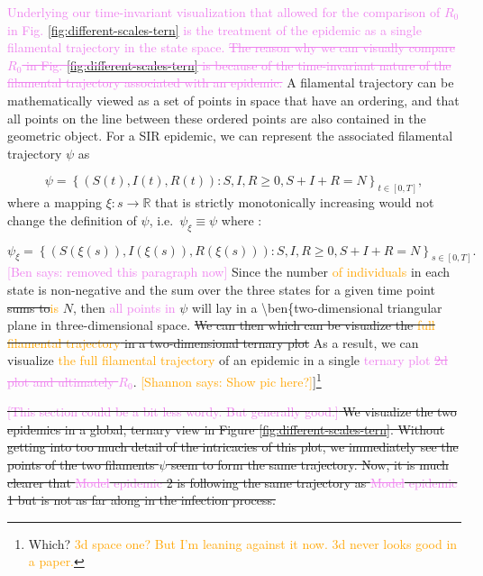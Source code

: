 \documentclass[
  shortnames]{jss}
\begin{document}
\textcolor{violet}{Underlying our time-invariant visualization that allowed for the comparison of $R_0$ in Fig. \ref{fig:different-scales-tern} is the treatment of the epidemic as a single filamental trajectory in the state space. \sout{The reason why we can visually compare $R_0$ in Fig. \ref{fig:different-scales-tern} is because of the time-invariant nature of the filamental trajectory associated with an epidemic.}}
A filamental trajectory can be mathematically viewed as a set of points
in space that have an ordering, and that all points on the line between
these ordered points are also contained in the geometric object. For a
SIR epidemic, we can represent the associated filamental trajectory
\(\psi\) as

\[
\psi = \left \{(S(t), I(t), R(t)): S, I, R \ge 0, S + I + R = N \right \}_{t\in[0,T]},
\] where a mapping \(\xi : s \to \mathbb{R}\) that is strictly
monotonically increasing would not change the definition of \(\psi\),
i.e.~\(\psi_\xi \equiv \psi\) where :

\[
\psi_\xi = \left \{(S(\xi(s)), I(\xi(s)), R(\xi(s))): S, I, R \ge 0, S + I + R = N \right \}_{s\in[0,T]}.
\] \textcolor{violet}{[Ben says: removed this paragraph now]} Since the
number \textcolor{orange}{of individuals} in each state is non-negative
and the sum over the three states for a given time point
\sout{sums to}\textcolor{orange}{is} \(N\), then
\textcolor{violet}{all points in} \(\psi\) will lay in a
\textbackslash ben\{two-dimensional triangular plane in
three-dimensional space.
\sout{We can then which can be visualize the \textcolor{orange}{full filamental trajectory} in a two-dimensional ternary plot}
As a result, we can visualize
\textcolor{orange}{the full filamental trajectory} of an epidemic in a
single
\textcolor{violet}{ternary plot \sout{2d plot and ultimately $R_0$}}.
\textcolor{orange}{[Shannon says: Show pic here?]}{]}\footnote{Which?  \textcolor{orange}{3d space one? But I'm leaning against it now.   3d never looks good in a paper.}}

\sout{\textcolor{violet}{[This section could be a bit less wordy. But generally good.]} We visualize the two epidemics in a global, ternary view in Figure \ref{fig:different-scales-tern}.  Without getting into too much detail of the intricacies of this plot, we immediately see the points of the two filaments $\psi$ seem to form the same trajectory.  Now, it is much clearer that \textcolor{violet}{\sout{Model} epidemic} 2 is following the same trajectory as \textcolor{violet}{\sout{Model} epidemic} 1 but is not as far along in the infection process. }
\end{document}
